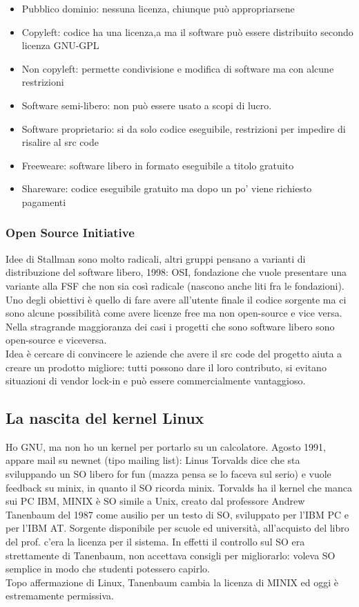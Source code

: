 \documentclass[18px]{article}
\begin{document}
\begin{itemize}
\item Pubblico dominio: nessuna licenza, chiunque può appropriarsene
\item Copyleft: codice ha una licenza,a ma il software può essere distribuito secondo licenza GNU-GPL
\item Non copyleft: permette condivisione e modifica di software ma con alcune restrizioni
\item Software semi-libero: non può essere usato a scopi di lucro.
\item Software proprietario: si da solo codice eseguibile, restrizioni per impedire di risalire al src code
\item Freeweare: software libero in formato eseguibile a titolo gratuito
\item Shareware: codice eseguibile gratuito ma dopo un po' viene richiesto pagamenti
\end{itemize}
\subsubsection{Open Source Initiative}
Idee di Stallman sono molto radicali, altri gruppi pensano a varianti di distribuzione del software libero, 1998: OSI, fondazione che vuole presentare una variante alla FSF che non sia così radicale (nascono anche liti fra le fondazioni).\\ Uno degli obiettivi è quello di fare avere all'utente finale il codice sorgente ma ci sono alcune possibilità come avere licenze free ma non open-source e vice versa.\\ Nella stragrande maggioranza dei casi i progetti che sono software libero sono open-source e viceversa.\\ Idea è cercare di convincere le aziende che avere il src code del progetto aiuta a creare un prodotto migliore: tutti possono dare il loro contributo, si evitano situazioni di vendor lock-in e può essere commercialmente vantaggioso.
\subsection{La nascita del kernel Linux}
Ho GNU, ma non ho un kernel per portarlo su un calcolatore. Agosto 1991, appare mail su newnet (tipo mailing list): Linus Torvalds dice che sta sviluppando un SO libero for fun (mazza pensa se lo faceva sul serio) e vuole feedback su minix, in quanto il SO ricorda minix. Torvalds ha il kernel che manca sui PC IBM, MINIX è SO simile a Unix, creato dal professore Andrew Tanenbaum del 1987 come ausilio per un testo di SO, sviluppato per l'IBM PC e per l'IBM AT. Sorgente disponibile per scuole ed università, all'acquisto del libro del prof. c'era la licenza per il sistema. In effetti il controllo sul SO era strettamente di Tanenbaum, non accettava consigli per migliorarlo: voleva SO semplice in modo che studenti potessero capirlo.\\ Topo affermazione di Linux, Tanenbaum cambia la licenza di MINIX ed oggi è estremamente permissiva.
\end{document}
